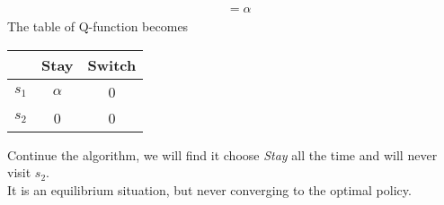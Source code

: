 \documentclass{myhw}
\begin{document}
\begin{homeworkProblem}
\begin{homeworkSection}
\begin{gather*}
\begin{aligned}
&= \alpha
\end{aligned}
\end{gather*}
The table of Q-function becomes 
\begin{center}
\begin{tabular}{c|c|c}
  & Stay & Switch \\ 
 \hline
 $s_1$ & $\alpha$ & 0 \\  
 \hline
 $s_2$ & 0 & 0    
\end{tabular} 
\end{center}
Continue the algorithm, we will find it choose \emph{Stay} all the time and will never visit $s_2$. \\
It is an equilibrium situation, but never converging to the optimal policy.
\end{homeworkSection}
\end{homeworkProblem}
\end{document}
